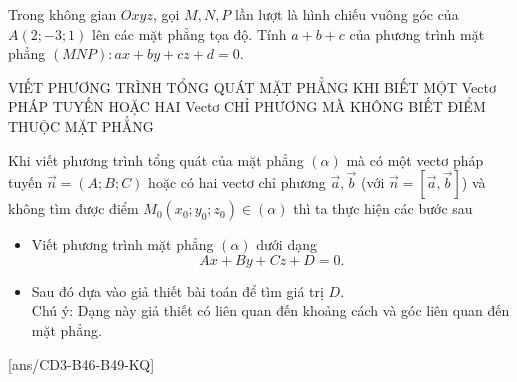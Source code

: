 \begin{ex}%
	Trong không gian $Oxyz$, gọi $M, N, P$ lần lượt là hình chiếu vuông góc của $A(2 ;-3 ; 1)$ lên các mặt phẳng tọa độ. Tính $a+b+c$ của phương trình mặt phẳng $(MNP)\colon ax+by+cz+d=0$. 
\end{ex}
\begin{dang}{VIẾT PHƯƠNG TRÌNH TỔNG QUÁT MẶT PHẲNG KHI BIẾT MỘT Vectơ PHÁP TUYẾN HOẶC HAI Vectơ CHỈ PHƯƠNG MÀ KHÔNG BIẾT ĐIỂM THUỘC MẶT PHẲNG}
\end{dang}
\begin{tomtat}
	Khi viết phương trình tổng quát của mặt phẳng $(\alpha)$ mà có một vectơ pháp tuyến $\overrightarrow{n}=(A ; B ; C)$ hoặc có hai vectơ chỉ phương $\overrightarrow{a}, \overrightarrow{b}$ (với $\overrightarrow{n}=\left[\overrightarrow{a}, \overrightarrow{b}\right]$) và không tìm được điểm $M_0\left(x_0 ; y_0 ; z_0\right) \in(\alpha)$ thì ta thực hiện các bước sau
	\begin{itemize}
		\item Viết phương trình mặt phẳng $(\alpha)$ dưới dạng
		$$
		Ax+By+Cz+D=0
		.$$
		\item Sau đó dựa vào giả thiết bài toán để tìm giá trị $D$.\\
		Chú ý: Dạng này giả thiết có liên quan đến khoảng cách và góc liên quan đến mặt phẳng.
	\end{itemize}
\end{tomtat}
[ans/CD3-B46-B49-KQ]
\TN
